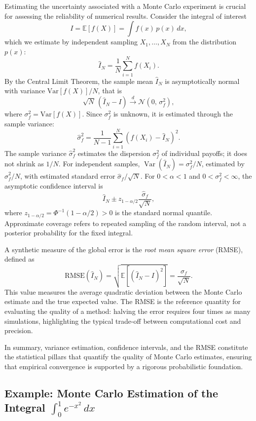 Estimating the uncertainty associated with a Monte Carlo experiment is crucial for assessing the reliability of numerical results.  
Consider the integral of interest
\[
I = \mathbb{E}[f(X)] = \int f(x)\,p(x)\,dx,
\]
which we estimate by independent sampling $X_1,\dots,X_N$ from the distribution $p(x)$:
\[
\hat{I}_N = \frac{1}{N}\sum_{i=1}^N f(X_i).
\]
By the Central Limit Theorem, the sample mean $\hat{I}_N$ is asymptotically normal with variance $\mathrm{Var}[f(X)]/N$, that is
\[
\sqrt{N}\,(\hat{I}_N - I) \xrightarrow{d} \mathcal{N}(0,\,\sigma_f^2),
\]
where $\sigma_f^2 = \mathrm{Var}[f(X)]$. Since $\sigma_f^2$ is unknown, it is estimated through the sample variance:
\[
\hat{\sigma}_f^2 = \frac{1}{N-1}\sum_{i=1}^N \left(f(X_i) - \hat{I}_N\right)^2.
\]
The sample variance $\hat\sigma_f^2$ estimates the dispersion
$\sigma_f^2$ of individual payoffs; it does not shrink as $1/N$.
For independent samples,
$\operatorname{Var}(\hat I_N)=\sigma_f^2/N$, estimated by
$\hat\sigma_f^2/N$, with estimated standard error
$\hat\sigma_f/\sqrt N$. For $0<\alpha<1$ and
$0<\sigma_f^2<\infty$, the asymptotic confidence interval is
\[
\hat I_N\pm z_{1-\alpha/2}\frac{\hat\sigma_f}{\sqrt N},
\]
where $z_{1-\alpha/2}=\Phi^{-1}(1-\alpha/2)>0$ is the standard normal
quantile.
Approximate coverage refers to repeated sampling of the random
interval, not a posterior probability for the fixed integral.

A synthetic measure of the global error is the \emph{root mean square error} (RMSE), defined as
\[
\mathrm{RMSE}(\hat{I}_N) = \sqrt{\mathbb{E}\left[(\hat{I}_N - I)^2\right]} = \frac{\sigma_f}{\sqrt{N}}.
\]
This value measures the average quadratic deviation between the Monte Carlo estimate and the true expected value.  
The RMSE is the reference quantity for evaluating the quality of a method: halving the error requires four times as many simulations, highlighting the typical trade-off between computational cost and precision.

In summary, variance estimation, confidence intervals, and the RMSE constitute the statistical pillars that quantify the quality of Monte Carlo estimates, ensuring that empirical convergence is supported by a rigorous probabilistic foundation.
\subsection{Example: Monte Carlo Estimation of the Integral \texorpdfstring{$\int_0^1 e^{-x^2}\,dx$}{integral from 0 to 1 of exp(-x squared) dx}}

